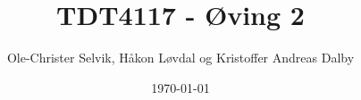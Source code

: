 \documentclass[]{article}
\begin{document}
\title{TDT4117 - Øving 2}
\author{Ole-Christer Selvik, Håkon Løvdal og Kristoffer Andreas Dalby}
\date{\today}
\maketitle

\pagebreak






\end{document}
